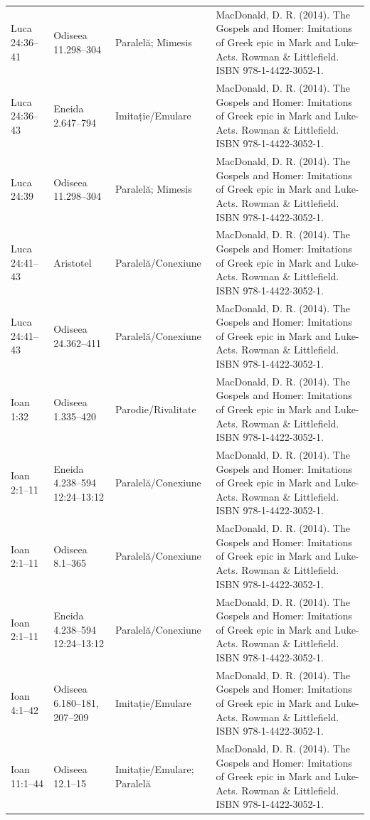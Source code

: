 \documentclass[12pt,a4paper,twoside,openany]{book}
\begin{document}
\begin{longtable}{L{1.4cm}L{1.7cm}L{3.1cm}L{8.4cm}}
Luca 24:36–41 & Odiseea 11.298–304 & Paralelă; Mimesis & MacDonald, D. R. (2014). The Gospels and Homer: Imitations of Greek epic in Mark and Luke-Acts. Rowman \& Littlefield. ISBN 978-1-4422-3052-1. \\
Luca 24:36–43 & Eneida 2.647–794 & Imitație/Emulare & MacDonald, D. R. (2014). The Gospels and Homer: Imitations of Greek epic in Mark and Luke-Acts. Rowman \& Littlefield. ISBN 978-1-4422-3052-1. \\
Luca 24:39 & Odiseea 11.298–304 & Paralelă; Mimesis & MacDonald, D. R. (2014). The Gospels and Homer: Imitations of Greek epic in Mark and Luke-Acts. Rowman \& Littlefield. ISBN 978-1-4422-3052-1. \\
Luca 24:41–43 & Aristotel & Paralelă/Conexiune & MacDonald, D. R. (2014). The Gospels and Homer: Imitations of Greek epic in Mark and Luke-Acts. Rowman \& Littlefield. ISBN 978-1-4422-3052-1. \\
Luca 24:41–43 & Odiseea 24.362–411 & Paralelă/Conexiune & MacDonald, D. R. (2014). The Gospels and Homer: Imitations of Greek epic in Mark and Luke-Acts. Rowman \& Littlefield. ISBN 978-1-4422-3052-1. \\
Ioan 1:32 & Odiseea 1.335–420 & Parodie/Rivalitate & MacDonald, D. R. (2014). The Gospels and Homer: Imitations of Greek epic in Mark and Luke-Acts. Rowman \& Littlefield. ISBN 978-1-4422-3052-1. \\
Ioan 2:1–11 & Eneida 4.238–594 12:24–13:12 & Paralelă/Conexiune & MacDonald, D. R. (2014). The Gospels and Homer: Imitations of Greek epic in Mark and Luke-Acts. Rowman \& Littlefield. ISBN 978-1-4422-3052-1. \\
Ioan 2:1–11 & Odiseea 8.1–365 & Paralelă/Conexiune & MacDonald, D. R. (2014). The Gospels and Homer: Imitations of Greek epic in Mark and Luke-Acts. Rowman \& Littlefield. ISBN 978-1-4422-3052-1. \\
Ioan 2:1–11 & Eneida 4.238–594 12:24–13:12 & Paralelă/Conexiune & MacDonald, D. R. (2014). The Gospels and Homer: Imitations of Greek epic in Mark and Luke-Acts. Rowman \& Littlefield. ISBN 978-1-4422-3052-1. \\
Ioan 4:1–42 & Odiseea 6.180–181, 207–209 & Imitație/Emulare & MacDonald, D. R. (2014). The Gospels and Homer: Imitations of Greek epic in Mark and Luke-Acts. Rowman \& Littlefield. ISBN 978-1-4422-3052-1. \\
Ioan 11:1–44 & Odiseea 12.1–15 & Imitație/Emulare; Paralelă & MacDonald, D. R. (2014). The Gospels and Homer: Imitations of Greek epic in Mark and Luke-Acts. Rowman \& Littlefield. ISBN 978-1-4422-3052-1. \\

\end{longtable}
\end{document}
